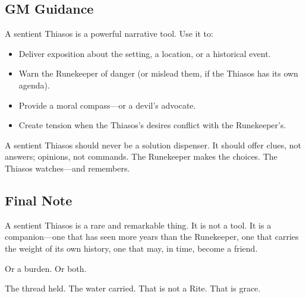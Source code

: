\subsection{GM Guidance}

A sentient Thiasos is a powerful narrative tool. Use it to:

\begin{itemize}
\item Deliver exposition about the setting, a location, or a historical event.
\item Warn the Runekeeper of danger (or mislead them, if the Thiasos has its own agenda).
\item Provide a moral compass—or a devil's advocate.
\item Create tension when the Thiasos's desires conflict with the Runekeeper's.
\end{itemize}

A sentient Thiasos should never be a solution dispenser. It should offer clues, not answers; opinions, not commands. The Runekeeper makes the choices. The Thiasos watches—and remembers.

\subsection{Final Note}

A sentient Thiasos is a rare and remarkable thing. It is not a tool. It is a companion—one that has seen more years than the Runekeeper, one that carries the weight of its own history, one that may, in time, become a friend.

Or a burden. Or both.

The thread held. The water carried. That is not a Rite. That is grace.
